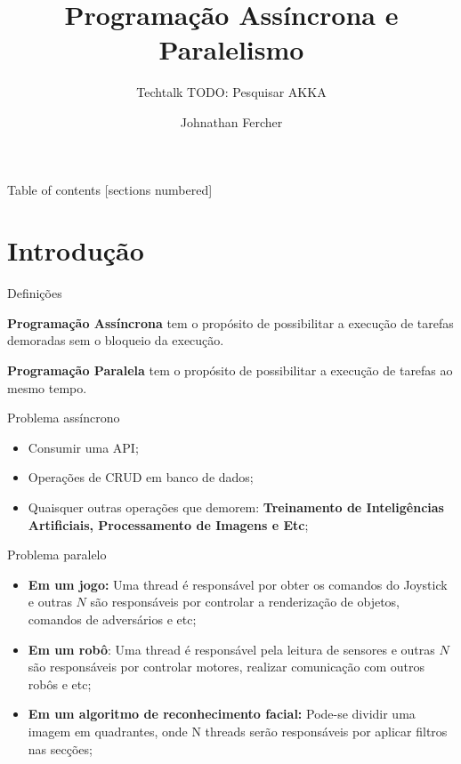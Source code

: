 \documentclass[10pt]{beamer}
\title{Programação Assíncrona e Paralelismo}
\subtitle{Techtalk TODO: Pesquisar AKKA}
\author{Johnathan Fercher}
\begin{document}
\maketitle

\begin{frame}{Table of contents}
  [sections numbered]
  \tableofcontents[hideallsubsections]
\end{frame}

\section{Introdução}

\begin{frame}[fragile]{Definições}

  \textbf{Programação Assíncrona} tem o propósito de possibilitar a execução de tarefas demoradas sem o bloqueio da execução.

  \textbf{Programação Paralela} tem o propósito de possibilitar a execução de tarefas ao mesmo tempo.
  
\end{frame}
\begin{frame}[fragile]{Problema assíncrono}
	\begin{itemize}
		\item Consumir uma API;
		\item Operações de CRUD em banco de dados;
		\item Quaisquer outras operações que demorem: \textbf{Treinamento de Inteligências Artificiais, Processamento de Imagens e Etc};
	\end{itemize}
\end{frame}

\begin{frame}[fragile]{Problema paralelo}
	\begin{itemize}
		\item \textbf{Em um jogo:} Uma thread é responsável por obter os comandos do Joystick e outras $N$ são responsáveis por controlar a renderização de objetos, comandos de adversários e etc;
		\item \textbf{Em um robô}: Uma thread é responsável pela leitura de sensores e outras $N$ são responsáveis por controlar motores, realizar comunicação com outros robôs e etc;
		\item \textbf{Em um algoritmo de reconhecimento facial:} Pode-se dividir uma imagem em quadrantes, onde N threads serão responsáveis por aplicar filtros nas secções;
	\end{itemize}
\end{frame}
\end{document}
